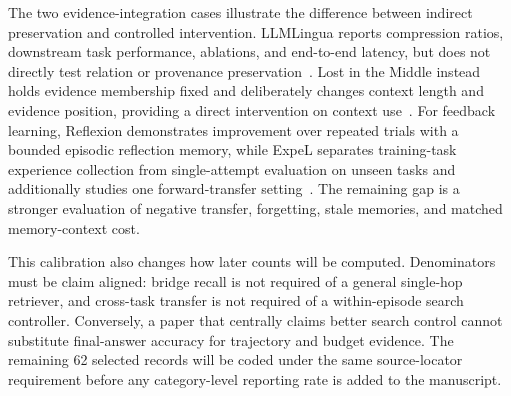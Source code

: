 The two evidence-integration cases illustrate the difference between indirect preservation and controlled intervention. LLMLingua reports compression ratios, downstream task performance, ablations, and end-to-end latency, but does not directly test relation or provenance preservation~\cite{jiang2023llmlingua}. Lost in the Middle instead holds evidence membership fixed and deliberately changes context length and evidence position, providing a direct intervention on context use~\cite{liu2024lostmiddle}. For feedback learning, Reflexion demonstrates improvement over repeated trials with a bounded episodic reflection memory, while ExpeL separates training-task experience collection from single-attempt evaluation on unseen tasks and additionally studies one forward-transfer setting~\cite{shinn2023reflexion,zhao2024expel}. The remaining gap is a stronger evaluation of negative transfer, forgetting, stale memories, and matched memory-context cost.

This calibration also changes how later counts will be computed. Denominators must be claim aligned: bridge recall is not required of a general single-hop retriever, and cross-task transfer is not required of a within-episode search controller. Conversely, a paper that centrally claims better search control cannot substitute final-answer accuracy for trajectory and budget evidence. The remaining 62 selected records will be coded under the same source-locator requirement before any category-level reporting rate is added to the manuscript.
